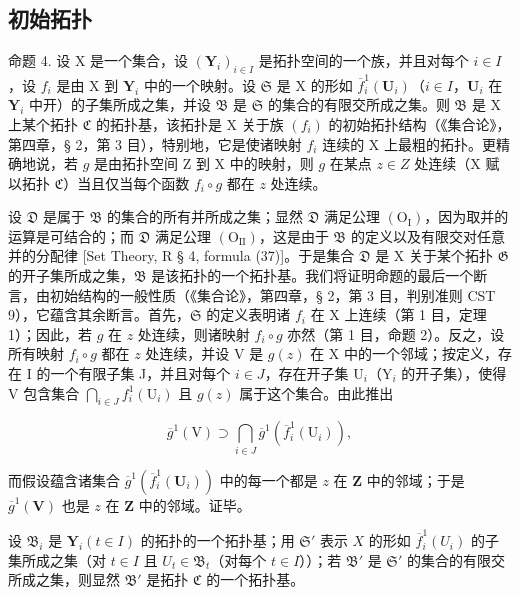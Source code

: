 \subsection{初始拓扑}

命题 4. 设 X 是一个集合，设 \((\mathbf{Y}_i)_{i \in I}\) 是拓扑空间的一个族，并且对每个 \(i \in I\)，设 \(f_i\) 是由 X 到 \(\mathbf{Y}_i\) 中的一个映射。设 \(\mathfrak{S}\) 是 X 的形如 \(\overline{f}_i^1 (\mathbf{U}_i)\)（\(i \in I\)，\(\mathbf{U}_i\) 在 \(\mathbf{Y}_i\) 中开）的子集所成之集，并设 \(\mathfrak{B}\) 是 \(\mathfrak{S}\) 的集合的有限交所成之集。则 \(\mathfrak{B}\) 是 X 上某个拓扑 \(\mathfrak{C}\) 的拓扑基，该拓扑是 X 关于族 \((f_i)\) 的初始拓扑结构（《集合论》，第四章，§ 2，第 3 目），特别地，它是使诸映射 \(f_i\) 连续的 X 上最粗的拓扑。更精确地说，若 \(g\) 是由拓扑空间 Z 到 X 中的映射，则 \(g\) 在某点 \(z \in Z\) 处连续（X 赋以拓扑 \(\mathfrak{C}\)）当且仅当每个函数 \(f_i \circ g\) 都在 \(z\) 处连续。

设 \(\mathfrak{D}\) 是属于 \(\mathfrak{B}\) 的集合的所有并所成之集；显然 \(\mathfrak{D}\) 满足公理 \((\mathrm{O}_{\mathrm{I}})\)，因为取并的运算是可结合的；而 \(\mathfrak{D}\) 满足公理 \((\mathrm{O}_{\mathrm{II}})\)，这是由于 \(\mathfrak{B}\) 的定义以及有限交对任意并的分配律 {[}Set Theory, R § 4, formula (37){]}。于是集合 \(\mathfrak{D}\) 是 X 关于某个拓扑 \(\mathfrak{G}\) 的开子集所成之集，\(\mathfrak{B}\) 是该拓扑的一个拓扑基。我们将证明命题的最后一个断言，由初始结构的一般性质（《集合论》，第四章，§ 2，第 3 目，判别准则 CST 9），它蕴含其余断言。首先，\(\mathfrak{S}\) 的定义表明诸 \(f_{i}\) 在 X 上连续（第 1 目，定理 1）；因此，若 \(g\) 在 \(z\) 处连续，则诸映射 \(f_{i} \circ g\) 亦然（第 1 目，命题 2）。反之，设所有映射 \(f_{i} \circ g\) 都在 \(z\) 处连续，并设 V 是 \(g(z)\) 在 X 中的一个邻域；按定义，存在 I 的一个有限子集 J，并且对每个 \(i \in J\)，存在开子集 \(\mathrm{U}_{i}\)（\(\mathrm{Y}_{i}\) 的开子集），使得 V 包含集合 \(\bigcap_{i \in J} f_{i}^{1}(\mathrm{U}_{i})\) 且 \(g(z)\) 属于这个集合。由此推出

\[
\overline {{g}} ^ {1} (\mathrm{V}) \supset \bigcap_ {i \in J} \overline {{g}} ^ {1} (\overline {{f}} _ {i} ^ {1} (\mathrm{U} _ {i})),
\]

而假设蕴含诸集合 \(\overline{g}^{1}(\overline{f}_{i}^{1}(\mathbf{U}_{i}))\) 中的每一个都是 \(z\) 在 \(\mathbf{Z}\) 中的邻域；于是 \(\overline{g}^{1}(\mathbf{V})\) 也是 \(z\) 在 \(\mathbf{Z}\) 中的邻域。证毕。

设 \(\mathfrak{B}_i\) 是 \(\mathbf{Y}_i(t\in I)\) 的拓扑的一个拓扑基；用 \(\mathfrak{S}'\) 表示 \(X\) 的形如 \(\overline{f}_i^1 (U_i)\) 的子集所成之集（对 \(t\in I\) 且 \(U_{t}\in \mathfrak{B}_{t}\)（对每个 \(t\in I\)））；若 \(\mathfrak{B}'\) 是 \(\mathfrak{S}'\) 的集合的有限交所成之集，则显然 \(\mathfrak{B}'\) 是拓扑 \(\mathfrak{C}\) 的一个拓扑基。

